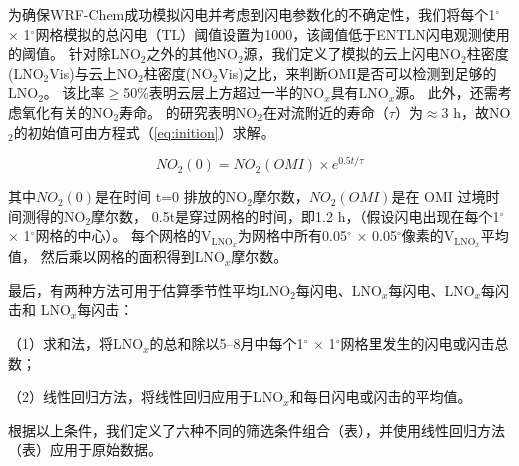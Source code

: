 为确保WRF-Chem成功模拟闪电并考虑到闪电参数化的不确定性，我们将每个1$^{\circ}$ $\times$ 1$^{\circ}$网格模拟的总闪电（TL）阈值设置为1000，该阈值低于ENTLN闪电观测使用的阈值。
针对除LNO$_2$之外的其他NO$_2$源，我们定义了模拟的云上闪电NO$_2$柱密度(LNO$_2$Vis)与云上NO$_2$柱密度(NO$_2$Vis)之比，来判断OMI是否可以检测到足够的LNO$_2$。
该比率$\geq$50\%表明云层上方超过一半的NO$_x$具有LNO$_x$源。
此外，还需考虑氧化有关的NO$_2$寿命。
\citet{Nault.2017}的研究表明NO$_2$在对流附近的寿命（$\tau$）为$\approx$3 h，故NO$_2$的初始值可由方程式（\ref{eq:inition}）求解。

\begin{equation} \label{eq:inition}
NO_2(0) = NO_2(OMI) \times e^{0.5t/\tau}
\end{equation}

其中$NO_2(0)$是在时间 t=0 排放的NO$_2$摩尔数，$NO_2(OMI)$是在 OMI 过境时间测得的NO$_2$摩尔数，
0.5t是穿过网格的时间，即1.2 h，（假设闪电出现在每个1$^{\circ}$ $\times$ 1$^{\circ}$网格的中心）。
每个网格的V$_\textrm{LNO$_x$}$为网格中所有0.05$^{\circ}$ $\times$ 0.05$^{\circ}$像素的V$_\textrm{LNO$_x$}$平均值，
然后乘以网格的面积得到LNO$_x$摩尔数。

最后，有两种方法可用于估算季节性平均LNO$_2$每闪电、LNO$_x$每闪电、LNO$_x$每闪击和 LNO$_x$每闪击：

（1）求和法，将LNO$_x$的总和除以5--8月中每个1$^{\circ}$ $\times$ 1$^{\circ}$网格里发生的闪电或闪击总数；

（2）线性回归方法，将线性回归应用于LNO$_x$和每日闪电或闪击的平均值。


根据以上条件，我们定义了六种不同的筛选条件组合（表），并使用线性回归方法（表）应用于原始数据。

